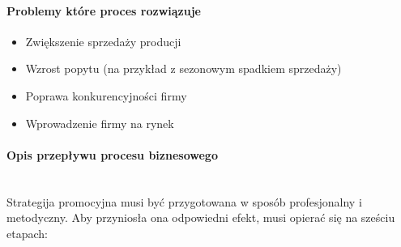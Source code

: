 \documentclass[a4paper, 12pt]{article}
\begin{document}
\paragraph{Problemy które proces rozwiązuje}
\begin{itemize}
	\item Zwiększenie sprzedaży producji
	\item Wzrost popytu (na przykład z sezonowym spadkiem sprzedaży)
	\item Poprawa konkurencyjności firmy
	\item Wprowadzenie firmy na rynek
\end{itemize}
\newpage
\paragraph{Opis przepływu procesu biznesowego}\mbox{}\\
\hspace*{1 cm}Strategija promocyjna musi być przygotowana w sposób profesjonalny i metodyczny. Aby przyniosła ona odpowiedni efekt, musi opierać się na sześciu etapach:
\end{document}
